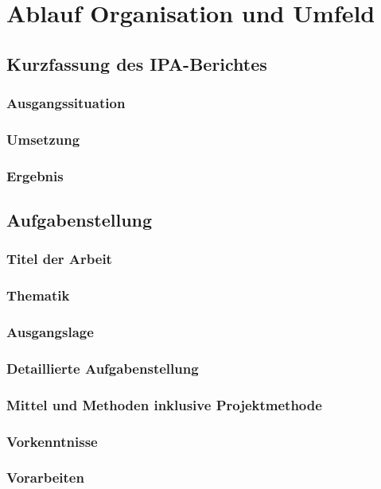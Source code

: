 \part{Ablauf Organisation und Umfeld}
\chapter{Kurzfassung des IPA-Berichtes}
\section{Ausgangssituation}
\section{Umsetzung}
\section{Ergebnis}

\tableofcontents



\chapter{Aufgabenstellung}
\section{Titel der Arbeit}
\section{Thematik}
\section{Ausgangslage}
\section{Detaillierte Aufgabenstellung}
\section{Mittel und Methoden inklusive Projektmethode}
\section{Vorkenntnisse}
\section{Vorarbeiten}
